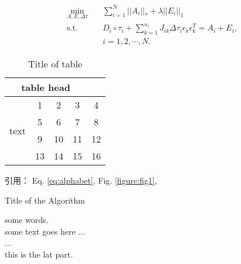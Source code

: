 \documentclass[UTF8,a4paper,12pt]{ctexart}
\begin{document}
 \begin{equation}
 \begin{aligned} \label{eq:rasl}
 \min_{A,E,\Delta \tau} \quad & \sum_{i=1}^{N}||A_i||_* + \lambda ||E_i||_1  \\
 \mathrm{s.t.} \quad & D_i \circ \tau_i + \sum_{k=1}^{n_i} J_{ik} \Delta \tau_i \epsilon_k \epsilon_k^T = A_i + E_i, \\
 & i = 1,2,\cdots,N. 
 \end{aligned}
 \end{equation}
 
 \begin{table}[htbp]
 	\caption{Title of table} \label{tab:table}
 	\centering
 	\addtolength{\tabcolsep}{-0mm} %
 	\begin{tabular}{ccccc}
 		\toprule[0.75pt]	%
 		\multicolumn{4}{c}{table head} \\
 		\midrule[0.5pt]	%
 		\multirow{4}{*}{text} & 1 & 2 & 3 & 4 \\  %
 		& 5 & 6 & 7 & 8 \\
 		\cmidrule[0.5pt]{2-4}	%
 		& 9 & 10 & 11 & 12 \\
 		& 13 & 14 & 15 & 16 \\
 		\bottomrule[0.75pt]	%
 	\end{tabular}
 \end{table}
 引用： Eq. \eqref{eq:alphabet}, Fig. \ref{figure:fig1},  \\
 
 
 \begin{algorithm}
 	\caption{Title of the Algorithm}
 	\label{algo:ref}
 	\begin{algorithmic}[1]
 		\REQUIRE some words.  %
 		\ENSURE ~\\           %
 		some text goes here ... \\
 		\STATE ... \\  %
 		\ENDWHILE
 		\RETURN this is the lat part.  %
 	\end{algorithmic}
 \end{algorithm}
 
\renewcommand\refname{参考文献}
\printbibliography
\end{document}
